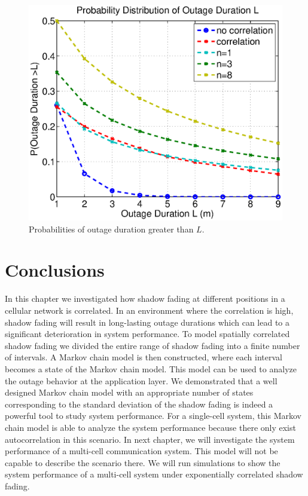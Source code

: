 \begin{figure}
\centering
\includegraphics[width=12cm]{result_Plot_new.eps}
\caption{Probabilities of outage duration greater than $L$.}
\label{prob}
\end{figure}

\section{Conclusions}
\label{sec:conclusion}
\par In this chapter we investigated how shadow fading at different positions in a cellular network is correlated. In an environment where the correlation is high, shadow fading will result in long-lasting outage durations which can lead to a significant deterioration in system performance. To model spatially correlated shadow fading we divided the entire range of shadow fading into a finite number of intervals. A Markov chain model is then constructed, where each interval becomes a state of the Markov chain model. This model can be used to analyze the  outage behavior at the application layer. We demonstrated that a well designed Markov chain model with an appropriate number of states corresponding to the standard deviation of the shadow fading is indeed a powerful tool to study system performance. For a single-cell system, this Markov chain model is able to analyze the system performance because there only exist autocorrelation in this scenario. In next chapter, we will investigate the system performance of a multi-cell communication system. This model will not be capable to describe the scenario there. We will run simulations to show the system performance of a multi-cell system under exponentially correlated shadow fading.

